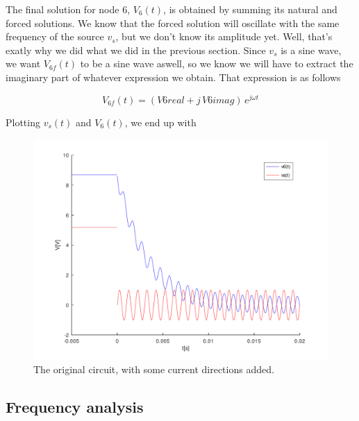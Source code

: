 The final solution for node 6, $V_6(t)$, is obtained by summing its natural and forced solutions. We know that the forced solution will oscillate with the same frequency of the source $v_s$, but we don't know its amplitude yet. Well, that's exatly why we did what we did in the previous section. Since $v_s$ is a sine wave, we want $V_{6f}(t)$ to be a sine wave aswell, so we know we will have to extract the imaginary part of whatever expression we obtain. That expression is as follows

\begin{center}
  \begin{equation}
    V_{6f}(t) = (V6real + j\,V6imag)\, e^{j\omega t}
  \end{equation} 
\end{center}

Plotting $v_s(t)$ and $V_6(t)$, we end up with

\begin{figure}[h] \centering
\includegraphics[width=0.6\linewidth]{../mat/t2-t5.pdf}
\caption{The original circuit, with some current directions added.}
\label{cfergter}
\end{figure}



\newpage

\subsection{Frequency analysis}

